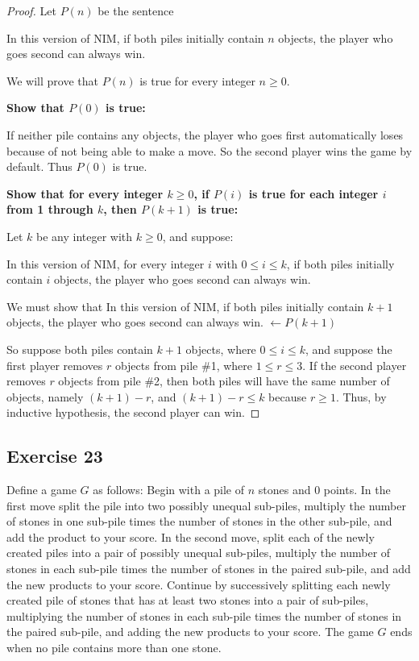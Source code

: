 \documentclass[14pt]{extarticle}
\newcommand{\from}{\leftarrow}
\newcommand{\cy}{\color{cyan}}
\begin{document}
\begin{proof}
Let $P(n)$ be the sentence 
\begin{center}
In this version of NIM, if both piles initially contain $n$ objects, the player who goes second can always win. 
\end{center}

We will prove that $P(n)$ is true for every integer $n \geq 0$.

{\bf Show that $P(0)$ is true:}

If neither pile contains any objects, the player who goes first automatically loses because of not being able to make a move. So the second player wins the game by default. Thus $P(0)$ is true. 

{\bf Show that for every integer $k \geq 0$, if $P(i)$ is true for each integer $i$ from 1 through $k$, then $P(k + 1)$ is true:}

Let $k$ be any integer with $k \geq 0$, and suppose: 
\begin{center}
In this version of NIM, for every integer $i$ with $0 \leq i \leq k$, 
if both piles initially contain $i$ objects, the player who goes second can always win. 
\end{center}
We must show that In this version of NIM, if both piles initially contain $k + 1$ objects, the player who goes second can always win. {\cy $\from P(k + 1)$}

So suppose both piles contain $k + 1$ objects, where $0 \leq i \leq k$, and 
suppose the first player removes $r$ objects from pile \#1, where $1 \leq r \leq 3$. 
If the second player removes $r$ objects from pile \#2, then both piles will 
have the same number of objects, namely $(k + 1) - r$, and $(k + 1) - r \leq k$ 
because $r \geq 1$. Thus, by inductive hypothesis, the second player can win.
\end{proof}

\subsection{Exercise 23}
Define a game $G$ as follows: Begin with a pile of $n$ stones and 0 points. In the first move split the pile into
two possibly unequal sub-piles, multiply the number of stones in one sub-pile times the number of stones in the
other sub-pile, and add the product to your score. In the second move, split each of the newly created piles into a
pair of possibly unequal sub-piles, multiply the number of stones in each sub-pile times the number of stones in the 
paired sub-pile, and add the new products to your score. Continue by successively splitting each newly created pile 
of stones that has at least two stones into a pair of sub-piles, multiplying the number of stones in each sub-pile 
times the number of stones in the paired sub-pile, and adding the new products to your score. The game $G$ ends 
when no pile contains more than one stone.
\end{document}

